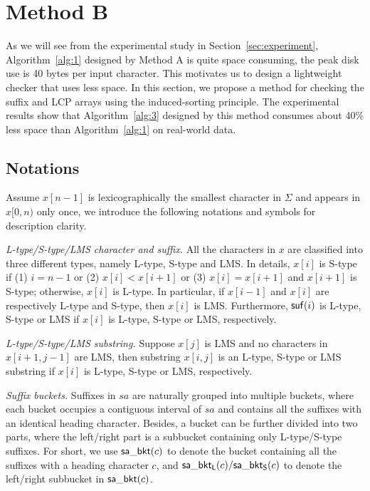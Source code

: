 \documentclass[10pt,journal,compsoc]{IEEEtran}
\begin{document}
	
	\section{Method B} \label{sec:method2}
	
	As we will see from the experimental study in Section~\ref{sec:experiment}, Algorithm~\ref{alg:1} designed by Method A is quite space consuming, the peak disk use is 40 bytes per input character. This motivates us to design a lightweight checker that uses less space. In this section, we propose a method for checking the suffix and LCP arrays using the induced-sorting principle. The experimental results show that Algorithm~\ref{alg:3} designed by this method consumes about 40\% less space than Algorithm~\ref{alg:1} on real-world data.
	
	\subsection{Notations} \label{sec:algorithm2:notations}
	
	Assume $x[n - 1]$ is lexicographically the smallest character in $\Sigma$ and appears in $x[0, n)$ only once, we introduce the following notations and symbols for description clarity.
	
	{\em L-type/S-type/LMS character and suffix.} All the characters in $x$ are classified into three different types, namely L-type, S-type and LMS. In details, $x[i]$ is S-type if (1) $i = n - 1$ or (2) $x[i] < x[i + 1]$ or (3) $x[i] = x[i+1]$ and $x[i+1]$ is S-type; otherwise, $x[i]$ is L-type. In particular, if $x[i - 1]$ and $x[i]$ are respectively L-type and S-type, then $x[i]$ is LMS. Furthermore, ${\sf suf}(i)$ is L-type, S-type or LMS if $x[i]$ is L-type, S-type or LMS, respectively.
	
	{\em L-type/S-type/LMS substring.} Suppose $x[j]$ is LMS and no characters in $x[i + 1, j - 1]$ are LMS, then substring $x[i, j]$ is an L-type, S-type or LMS substring if $x[i]$ is L-type, S-type or LMS, respectively.
	
	{\em Suffix buckets.} Suffixes in $sa$ are naturally grouped into multiple buckets, where each bucket occupies a contiguous interval of $sa$ and contains all the suffixes with an identical heading character. Besides, a bucket can be further divided into two parts, where the left/right part is a subbucket containing only L-type/S-type suffixes. For short, we use ${\sf sa\_bkt}(c)$ to denote the bucket containing all the suffixes with a heading character $c$, and ${\sf sa\_bkt_L}(c)/{\sf sa\_bkt_S}(c)$ to denote the left/right subbucket in ${\sf sa\_bkt}(c)$.
	
\end{document}
